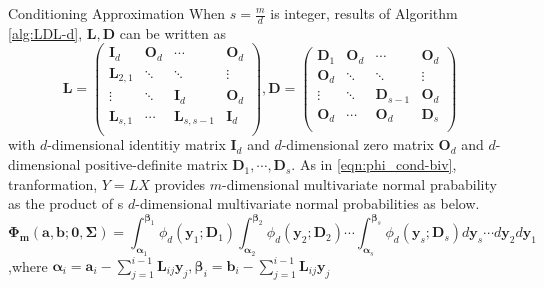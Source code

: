 \begin{frame}{Conditioning Approximation}
\footnotesize
When $s=\frac{m}{d}$ is integer, results of Algorithm \ref{alg:LDL-d}, $\mathbf{L}, \mathbf{D}$ can be written as
$$
\mathbf{L} = \begin{pmatrix}
\mathbf{I}_d & \mathbf{O}_d & \cdots &\mathbf{O}_d\\
\mathbf{L}_{2,1} & \ddots & \ddots &\vdots\\
\vdots & \ddots & \mathbf{I}_d & \mathbf{O}_d\\
\mathbf{L}_{s,1} & \cdots & \mathbf{L}_{s,s-1} &\mathbf{I}_d\\
\end{pmatrix},
\mathbf{D} = \begin{pmatrix}
\mathbf{D}_1 & \mathbf{O}_d & \cdots &\mathbf{O}_d\\
\mathbf{O}_{d} & \ddots & \ddots &\vdots\\
\vdots & \ddots & \mathbf{D}_{s-1} & \mathbf{O}_d\\
\mathbf{O}_d & \cdots & \mathbf{O}_d &\mathbf{D}_s\\
\end{pmatrix}
$$
with $d$-dimensional identitiy matrix $\mathbf{I}_d$ and $d$-dimensional zero matrix $\mathbf{O}_d$ and $d$-dimensional positive-definite matrix $\mathbf{D}_1,\cdots,\mathbf{D}_s$. 
As in \eqref{eqn:phi_cond-biv}, tranformation, $Y=LX$ provides $m$-dimensional multivariate normal prabability as the product of s $d$-dimensional multivariate normal probabilities as below.
\begin{equation}\label{eqn::phi_cond-ddim}
\boldsymbol{\Phi_m}(\mathbf{a},\mathbf{b};\mathbf{0},\boldsymbol{\Sigma})=\int_{\mathbf{\alpha}_1}^{\mathbf{\beta}_1}\phi_d(\mathbf{y}_1;\mathbf{D}_1)\int_{\mathbf{\alpha}_2}^{\mathbf{\beta}_2}\phi_d(\mathbf{y}_2;\mathbf{D}_2)\cdots\int_{\mathbf{\alpha}_s}^{\mathbf{\beta}_s}\phi_d(\mathbf{y}_s;\mathbf{D}_s)d\mathbf{y}_s\cdots d\mathbf{y}_2d\mathbf{y}_1
\end{equation}
,where $\boldsymbol{\alpha}_i=\mathbf{a}_i-\sum_{j=1}^{i-1}\mathbf{L}_{ij}\mathbf{y}_j, \boldsymbol{\beta}_i=\mathbf{b}_i-\sum_{j=1}^{i-1}\mathbf{L}_{ij}\mathbf{y}_j$
\end{frame}

